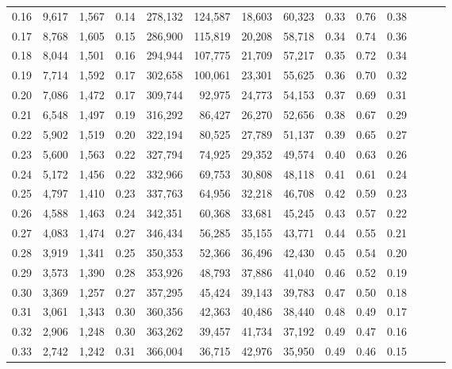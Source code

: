 \begin{tabular}{rrrrrrrrrrrrrr}
0.16 &   9,617 &  1,567 &  0.14 &  278,132 &  124,587 &  18,603 &  60,323 &  0.33 &  0.76 &      0.38 \\
0.17 &   8,768 &  1,605 &  0.15 &  286,900 &  115,819 &  20,208 &  58,718 &  0.34 &  0.74 &      0.36 \\
0.18 &   8,044 &  1,501 &  0.16 &  294,944 &  107,775 &  21,709 &  57,217 &  0.35 &  0.72 &      0.34 \\
0.19 &   7,714 &  1,592 &  0.17 &  302,658 &  100,061 &  23,301 &  55,625 &  0.36 &  0.70 &      0.32 \\
0.20 &   7,086 &  1,472 &  0.17 &  309,744 &   92,975 &  24,773 &  54,153 &  0.37 &  0.69 &      0.31 \\
0.21 &   6,548 &  1,497 &  0.19 &  316,292 &   86,427 &  26,270 &  52,656 &  0.38 &  0.67 &      0.29 \\
0.22 &   5,902 &  1,519 &  0.20 &  322,194 &   80,525 &  27,789 &  51,137 &  0.39 &  0.65 &      0.27 \\
0.23 &   5,600 &  1,563 &  0.22 &  327,794 &   74,925 &  29,352 &  49,574 &  0.40 &  0.63 &      0.26 \\
0.24 &   5,172 &  1,456 &  0.22 &  332,966 &   69,753 &  30,808 &  48,118 &  0.41 &  0.61 &      0.24 \\
0.25 &   4,797 &  1,410 &  0.23 &  337,763 &   64,956 &  32,218 &  46,708 &  0.42 &  0.59 &      0.23 \\
0.26 &   4,588 &  1,463 &  0.24 &  342,351 &   60,368 &  33,681 &  45,245 &  0.43 &  0.57 &      0.22 \\
0.27 &   4,083 &  1,474 &  0.27 &  346,434 &   56,285 &  35,155 &  43,771 &  0.44 &  0.55 &      0.21 \\
0.28 &   3,919 &  1,341 &  0.25 &  350,353 &   52,366 &  36,496 &  42,430 &  0.45 &  0.54 &      0.20 \\
0.29 &   3,573 &  1,390 &  0.28 &  353,926 &   48,793 &  37,886 &  41,040 &  0.46 &  0.52 &      0.19 \\
0.30 &   3,369 &  1,257 &  0.27 &  357,295 &   45,424 &  39,143 &  39,783 &  0.47 &  0.50 &      0.18 \\
0.31 &   3,061 &  1,343 &  0.30 &  360,356 &   42,363 &  40,486 &  38,440 &  0.48 &  0.49 &      0.17 \\
0.32 &   2,906 &  1,248 &  0.30 &  363,262 &   39,457 &  41,734 &  37,192 &  0.49 &  0.47 &      0.16 \\
0.33 &   2,742 &  1,242 &  0.31 &  366,004 &   36,715 &  42,976 &  35,950 &  0.49 &  0.46 &      0.15 \\

\end{tabular}
